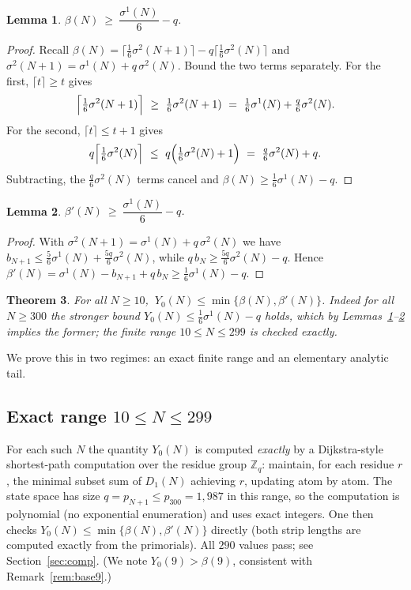 \documentclass[11pt]{amsart}
\theoremstyle{plain}
\newtheorem{theorem}{Theorem}[section]
\newtheorem{lemma}[theorem]{Lemma}
\theoremstyle{definition}
\newcommand{\Z}{\mathbb{Z}}
\begin{document}
\begin{lemma}\label{lem:Bbound}
$\beta(N)\ \ge\ \dfrac{\sigma^1(N)}{6}-q$.
\end{lemma}

\begin{proof}
Recall $\beta(N)=\lceil\tfrac16\sigma^2(N+1)\rceil-q\lceil\tfrac16\sigma^2(N)\rceil$
and $\sigma^2(N+1)=\sigma^1(N)+q\,\sigma^2(N)$.  Bound the two terms separately.
For the first, $\lceil t\rceil\ge t$ gives
\[
\Bigl\lceil\tfrac16\sigma^2(N+1)\Bigr\rceil\ \ge\ \tfrac16\sigma^2(N+1)
\ =\ \tfrac16\sigma^1(N)+\tfrac{q}{6}\sigma^2(N).
\]
For the second, $\lceil t\rceil\le t+1$ gives
\[
q\Bigl\lceil\tfrac16\sigma^2(N)\Bigr\rceil\ \le\ q\Bigl(\tfrac16\sigma^2(N)+1\Bigr)
\ =\ \tfrac{q}{6}\sigma^2(N)+q.
\]
Subtracting, the $\tfrac{q}{6}\sigma^2(N)$ terms cancel and
$\beta(N)\ge\tfrac16\sigma^1(N)-q$.
\end{proof}

\begin{lemma}\label{lem:Bprime}
$\beta'(N)\ \ge\ \dfrac{\sigma^1(N)}{6}-q$.
\end{lemma}

\begin{proof}
With $\sigma^2(N+1)=\sigma^1(N)+q\,\sigma^2(N)$ we have
$b_{N+1}\le\frac56\sigma^1(N)+\frac{5q}{6}\sigma^2(N)$, while
$q\,b_N\ge\frac{5q}{6}\sigma^2(N)-q$.  Hence
$\beta'(N)=\sigma^1(N)-b_{N+1}+q\,b_N\ge\frac16\sigma^1(N)-q$.
\end{proof}

\begin{theorem}\label{thm:Y0}
For all $N\ge 10$, $\ Y_0(N)\le\min\{\beta(N),\beta'(N)\}$.  Indeed for all $N\ge 300$
the stronger bound $Y_0(N)\le\tfrac16\sigma^1(N)-q$ holds, which by
Lemmas~\ref{lem:Bbound}--\ref{lem:Bprime} implies the former; the finite range
$10\le N\le 299$ is checked exactly.
\end{theorem}

We prove this in two regimes: an exact finite range and an elementary analytic
tail.

\subsection{Exact range \texorpdfstring{$10\le N\le 299$}{10 to 299}}
For each such $N$ the quantity $Y_0(N)$ is computed \emph{exactly} by a
Dijkstra-style shortest-path computation over the residue group $\Z_q$: maintain,
for each residue $r$, the minimal subset sum of $D_1(N)$ achieving $r$, updating
atom by atom.  The state space has size $q=p_{N+1}\le p_{300}=1{,}987$ in this
range, so the computation is polynomial (no exponential enumeration) and uses
exact integers.  One then checks $Y_0(N)\le\min\{\beta(N),\beta'(N)\}$ directly (both
strip lengths are computed exactly from the primorials).  All $290$ values pass;
see Section~\ref{sec:comp}.  (We note $Y_0(9)>\beta(9)$, consistent with
Remark~\ref{rem:base9}.)
\end{document}
